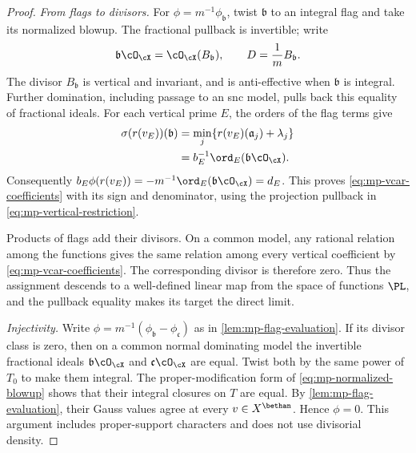 \begin{proof}
\emph{From flags to divisors.}
For $\phi=m^{-1}\phi_{\mathfrak b}$, twist
$\mathfrak b$ to an integral flag and take its normalized
blowup. The fractional pullback is invertible; write
\[
 \mathfrak b\cO_{\cX}=\cO_{\cX}(B_{\mathfrak b}),
 \qquad D=\frac1m B_{\mathfrak b}.
\]
The divisor $B_{\mathfrak b}$ is vertical and invariant,
and is anti-effective when $\mathfrak b$ is integral.
Further domination, including passage to an snc model,
pulls back this equality of fractional ideals. For each
vertical prime $E$, the orders of the flag terms give
\[
 \begin{aligned}
 \sigma(r(v_E))(\mathfrak b)
   &=\min_j\{r(v_E)(\mathfrak a_j)+\lambda_j\}\\
   &=b_E^{-1}\ord_E(\mathfrak b\cO_{\cX}).
 \end{aligned}
\]
Consequently
$b_E\phi(r(v_E))=-m^{-1}\ord_E(\mathfrak b\cO_{\cX})=d_E$.
This proves \eqref{eq:mp-vcar-coefficients} with its sign and
denominator, using the projection pullback in
\eqref{eq:mp-vertical-restriction}.

Products of flags add their divisors. On a common model,
any rational relation among the functions gives the same
relation among every vertical coefficient by
\eqref{eq:mp-vcar-coefficients}. The corresponding divisor
is therefore zero. Thus the assignment descends to a
well-defined linear map from the space of functions $\PL$,
and the pullback equality makes its target the direct limit.

\emph{Injectivity.}
Write $\phi=m^{-1}(\phi_{\mathfrak b}-\phi_{\mathfrak c})$
as in \cref{lem:mp-flag-evaluation}. If its divisor class is
zero, then on a common normal dominating model the
invertible fractional ideals
$\mathfrak b\cO_{\cX}$ and $\mathfrak c\cO_{\cX}$ are equal.
Twist both by the same power of $T_0$ to make them integral.
The proper-modification form of
\eqref{eq:mp-normalized-blowup} shows that their integral
closures on $T$ are equal. By
\cref{lem:mp-flag-evaluation}, their Gauss values agree at
every $v\in X^{\bethan}$. Hence $\phi=0$. This argument
includes proper-support characters and does not use
divisorial density.


\end{proof}
